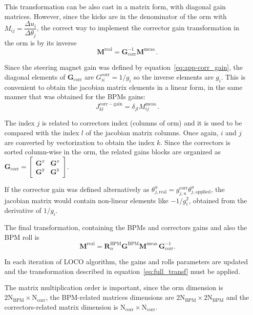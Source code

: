 This transformation can be also cast in a matrix form, with diagonal gain matrices. However, since the kicks are in the denominator of the \gls{orm} with $M_{ij} = \dfrac{\Delta u_i}{\Delta \theta_j}$, the correct way to implement the corrector gain transformation in the \gls{orm} is by its inverse
\begin{equation}
        \mathbf{M}^{\mathrm{real}} = \mathbf{G}^{-1}_{\mathrm{corr}} \mathbf{M}^{\mathrm{meas.}}.
\end{equation}

Since the steering magnet gain was defined by equation~\eqref{eq:app-corr_gain}, the diagonal elements of $\mathbf{G}_{\mathrm{corr}}$ are $G^{\mathrm{corr}}_{ii} = 1/g_{i}$ so the inverse elements are $g_{i}$. This is convenient to obtain the jacobian matrix elements in a linear form, in the same manner that was obtained for the BPMs gains:
\begin{equation}
    J_{kl}^{\mathrm{corr}-\mathrm{gain}} = \delta_{jl}M^{\mathrm{meas.}}_{ij}.
\end{equation}

The index $j$ is related to correctors index (columns of \gls{orm}) and it is used to be compared with the index $l$ of the jacobian matrix columns. Once again, $i$ and $j$ are converted by vectorization to obtain the index $k$. Since the correctors is sorted column-wise in the \gls{orm}, the related gains blocks are organized as $\mathbf{G}_{\mathrm{corr}} =
    \begin{bmatrix}
    \mathbf{G}^x & \mathbf{G}^x \\
    \mathbf{G}^y & \mathbf{G}^y
    \end{bmatrix}$.

If the corrector gain was defined alternatively as $\theta_{j, \mathrm{real}}^u = g_{j, u}^{\mathrm{corr}}\theta_{j, \mathrm{applied}}^u$, the jacobian matrix would contain non-linear elements like $-1/g_{i}^2$, obtained from the derivative of $1/g_{i}$.

The final transformation, containing the BPMs and correctors gains and also the BPM roll is
\begin{equation}
    \mathbf{M}^{\mathrm{real}} = \mathbf{R}^\mathrm{BPM}_\alpha\mathbf{G}^{\mathrm{BPM}} \mathbf{M}^{\mathrm{meas.}}\mathbf{G}^{-1}_{\mathrm{corr}}.
    \label{eq:full_transf}
\end{equation}

In each iteration of LOCO algorithm, the gains and rolls parameters are updated and the transformation described in equation~\eqref{eq:full_transf} must be applied.

The matrix multiplication order is important, since the \gls{orm} dimension is $2\mathrm{N}_{\mathrm{BPM}} \times \mathrm{N}_{\mathrm{corr}}$, the BPM-related matrices dimensions are $2\mathrm{N}_{\mathrm{BPM}} \times 2\mathrm{N}_{\mathrm{BPM}}$ and the correctors-related matrix dimension is $\mathrm{N}_{\mathrm{corr}} \times \mathrm{N}_{\mathrm{corr}}$. 